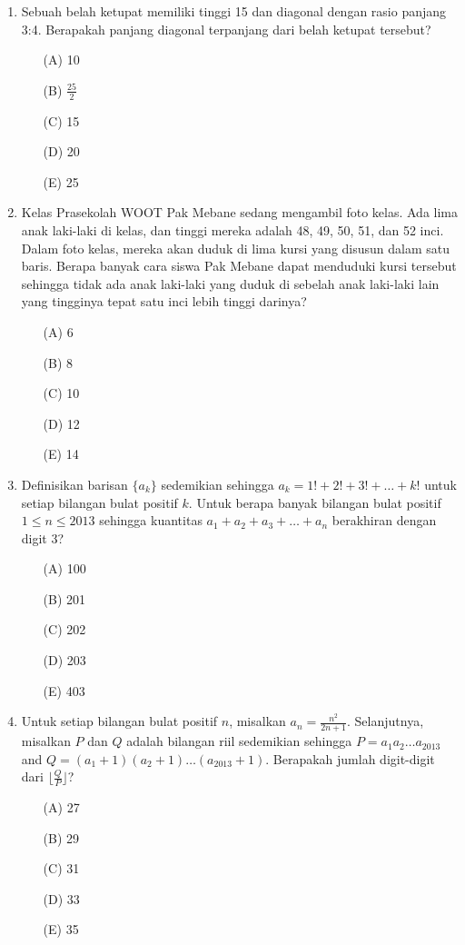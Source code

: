 \documentclass[12pt]{scrartcl}
\begin{document}
\begin{enumerate}
    \item Sebuah belah ketupat memiliki tinggi 15 dan diagonal dengan rasio panjang 3:4. Berapakah panjang diagonal terpanjang dari belah ketupat tersebut?
    \begin{itemize}
        \item[(A)] 10
        \item[(B)] $\frac{25}{2}$
        \item[(C)] 15
        \item[(D)] 20
        \item[(E)] 25
    \end{itemize}

    \item Kelas Prasekolah WOOT Pak Mebane sedang mengambil foto kelas. Ada lima anak laki-laki di kelas, dan tinggi mereka adalah 48, 49, 50, 51, dan 52 inci. Dalam foto kelas, mereka akan duduk di lima kursi yang disusun dalam satu baris. Berapa banyak cara siswa Pak Mebane dapat menduduki kursi tersebut sehingga tidak ada anak laki-laki yang duduk di sebelah anak laki-laki lain yang tingginya tepat satu inci lebih tinggi darinya?
    \begin{itemize}
        \item[(A)] 6
        \item[(B)] 8
        \item[(C)] 10
        \item[(D)] 12
        \item[(E)] 14
    \end{itemize}

    \item Definisikan barisan $\{a_{k}\}$ sedemikian sehingga $a_{k}=1!+2!+3!+\dots+k!$ untuk setiap bilangan bulat positif $k$. Untuk berapa banyak bilangan bulat positif $1\le n\le 2013$ sehingga kuantitas $a_{1}+a_{2}+a_{3}+\dots+a_{n}$ berakhiran dengan digit 3?
    \begin{itemize}
        \item[(A)] 100
        \item[(B)] 201
        \item[(C)] 202
        \item[(D)] 203
        \item[(E)] 403
    \end{itemize}

    \item Untuk setiap bilangan bulat positif $n$, misalkan $a_{n}=\frac{n^{2}}{2n+1}$. Selanjutnya, misalkan $P$ dan $Q$ adalah bilangan riil sedemikian sehingga $P=a_{1}a_{2}\dots a_{2013}$ and $Q=(a_{1}+1)(a_{2}+1)\dots(a_{2013}+1)$. Berapakah jumlah digit-digit dari $\lfloor\frac{Q}{P}\rfloor$?
    \begin{itemize}
        \item[(A)] 27
        \item[(B)] 29
        \item[(C)] 31
        \item[(D)] 33
        \item[(E)] 35
    \end{itemize}


\end{enumerate}
\end{document}
